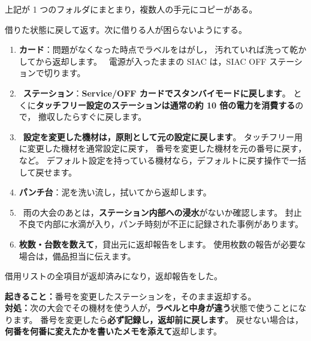 \begin{Done}
上記が 1 つのフォルダにまとまり，複数人の手元にコピーがある。
\end{Done}


\begin{Goal}
借りた状態に戻して返す。次に借りる人が困らないようにする。
\end{Goal}

\begin{enumerate}
\item \textbf{カード}：問題がなくなった時点でラベルをはがし，
      汚れていれば洗って乾かしてから返却します。
      \tSIAC\ 電源が入ったままの SIAC は，SIAC OFF ステーションで切ります。
\item \tSI\ \textbf{ステーション}：\textbf{Service/OFF カードでスタンバイモードに戻します}。
      とくに\textbf{タッチフリー設定のステーションは通常の約 10 倍の電力を消費する}ので，
      撤収したらすぐに戻します。
\item \tSI\ \textbf{設定を変更した機材は，原則として元の設定に戻します}。
      タッチフリー用に変更した機材を通常設定に戻す，
      番号を変更した機材を元の番号に戻す，など。
      デフォルト設定を持っている機材なら，デフォルトに戻す操作で一括して戻せます。
\item \textbf{パンチ台}：泥を洗い流し，拭いてから返却します。
\item \tSI\ 雨の大会のあとは，\textbf{ステーション内部への浸水}がないか確認します。
      封止不良で内部に水滴が入り，パンチ時刻が不正に記録された事例があります。
\item \textbf{枚数・台数を数えて}，貸出元に返却報告をします。
      使用枚数の報告が必要な場合は，備品担当に伝えます。
\end{enumerate}

\begin{Done}
借用リストの全項目が返却済みになり，返却報告をした。
\end{Done}

\begin{Fail}
\textbf{起きること：}番号を変更したステーションを，そのまま返却する。\\
\textbf{対処：}次の大会でその機材を使う人が，\textbf{ラベルと中身が違う}状態で使うことになります。
番号を変更したら\textbf{必ず記録し，返却前に戻します}。
戻せない場合は，\textbf{何番を何番に変えたかを書いたメモを添えて}返却します。
\end{Fail}


